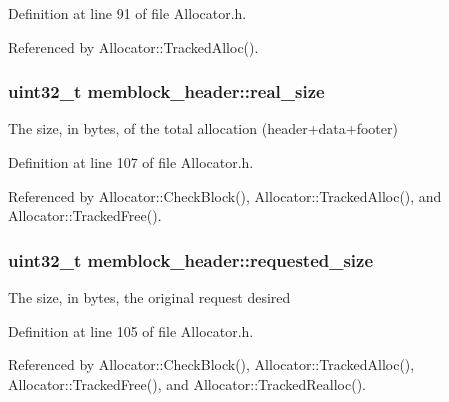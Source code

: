 Definition at line 91 of file Allocator.\-h.



Referenced by Allocator\-::\-Tracked\-Alloc().

\subsubsection[{real\-\_\-size}]{\setlength{\rightskip}{0pt plus 5cm}uint32\-\_\-t memblock\-\_\-header\-::real\-\_\-size}\label{structmemblock__header_acbea4f5572643309ac41e9493baaa7f7}
The size, in bytes, of the total allocation (header+data+footer) 

Definition at line 107 of file Allocator.\-h.



Referenced by Allocator\-::\-Check\-Block(), Allocator\-::\-Tracked\-Alloc(), and Allocator\-::\-Tracked\-Free().

\subsubsection[{requested\-\_\-size}]{\setlength{\rightskip}{0pt plus 5cm}uint32\-\_\-t memblock\-\_\-header\-::requested\-\_\-size}\label{structmemblock__header_a9f32a9108b8ca49a6296605b42ee3a54}
The size, in bytes, the original request desired 

Definition at line 105 of file Allocator.\-h.



Referenced by Allocator\-::\-Check\-Block(), Allocator\-::\-Tracked\-Alloc(), Allocator\-::\-Tracked\-Free(), and Allocator\-::\-Tracked\-Realloc().

